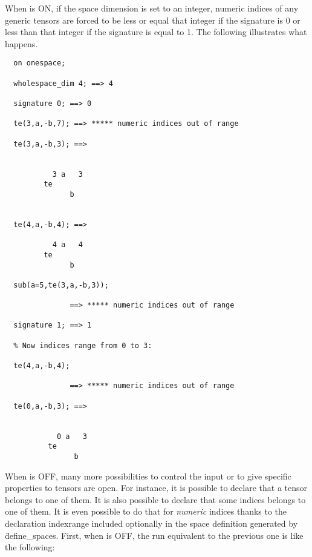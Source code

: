 When  is ON, if the space dimension is set to an integer, numeric
indices of any generic tensors are forced to be less or equal that integer
if the signature is 0 or less than that integer if the signature is equal to 1.
The following illustrates what happens.
\begin{verbatim}
  on onespace;

  wholespace_dim 4; ==> 4

  signature 0; ==> 0

  te(3,a,-b,7); ==> ***** numeric indices out of range

  te(3,a,-b,3); ==>


           3 a   3
         te
               b


  te(4,a,-b,4); ==>

           4 a   4
         te
               b

  sub(a=5,te(3,a,-b,3));

               ==> ***** numeric indices out of range

  signature 1; ==> 1

  % Now indices range from 0 to 3:

  te(4,a,-b,4);

               ==> ***** numeric indices out of range

  te(0,a,-b,3); ==>


            0 a   3
          te
                b
\end{verbatim}
When  is OFF,
many more possibilities to control the input or to
give specific properties to tensors are open.
For instance, it is possible to declare that a tensor belongs
to one of them. It is also possible to declare that some indices
belongs to one of them.  It is even possible to do that
for \emph{numeric} indices thanks to the declaration
indexrange
included optionally in the space definition generated by
\f{define\_spaces}.
First, when  is OFF, the run equivalent to the previous one is
like the following:
